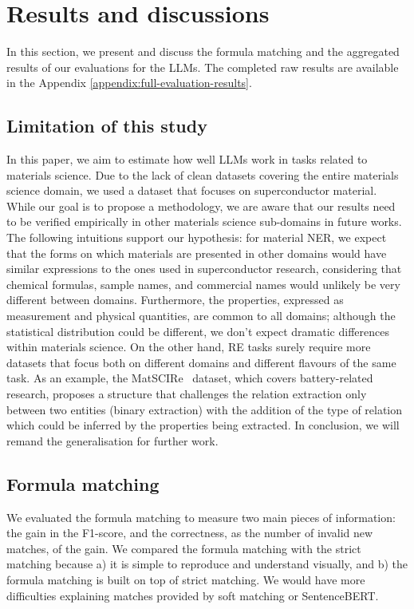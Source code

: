 \section{Results and discussions}
\label{sec:results}
In this section, we present and discuss the formula matching and the aggregated results of our evaluations for the LLMs. The completed raw results are available in the Appendix \ref{appendix:full-evaluation-results}. 

\subsection{Limitation of this study}
In this paper, we aim to estimate how well LLMs work in tasks related to materials science. 
Due to the lack of clean datasets covering the entire materials science domain, we used a dataset that focuses on superconductor material. 
While our goal is to propose a methodology, we are aware that our results need to be verified empirically in other materials science sub-domains in future works. 
The following intuitions support our hypothesis: for material NER, we expect that the forms on which materials are presented in other domains would have similar expressions to the ones used in superconductor research, considering that chemical formulas, sample names, and commercial names would unlikely be very different between domains. 
Furthermore, the properties, expressed as measurement and physical quantities, are common to all domains; although the statistical distribution could be different, we don't expect dramatic differences within materials science. 
On the other hand, RE tasks surely require more datasets that focus both on different domains and different flavours of the same task. 
As an example, the MatSCIRe~\cite{mullick2024matscire} dataset, which covers battery-related research, proposes a structure that challenges the relation extraction only between two entities (binary extraction) with the addition of the type of relation which could be inferred by the properties being extracted. 
In conclusion, we will remand the generalisation for further work. 

\subsection{Formula matching}
\label{subsec:formula-matching}
We evaluated the formula matching to measure two main pieces of information: the gain in the F1-score, and the correctness, as the number of invalid new matches, of the gain. 
We compared the formula matching with the strict matching because a) it is simple to reproduce and understand visually, and b) the formula matching is built on top of strict matching. 
We would have more difficulties explaining matches provided by soft matching or SentenceBERT. 

